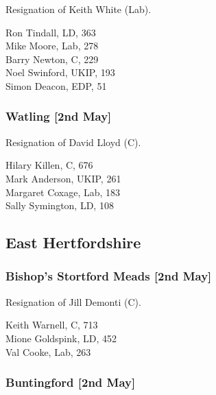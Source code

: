 \documentclass[a4paper,openany,10pt]{book}
\begin{document}
Resignation of Keith White (Lab).



Ron Tindall, LD, 363\\
Mike Moore, Lab, 278\\
Barry Newton, C, 229\\
Noel Swinford, UKIP, 193\\
Simon Deacon, EDP, 51\\


\subsubsection*{Watling \hspace*{\fill}\nolinebreak[1]%
\enspace\hspace*{\fill}
[2nd May]}


Resignation of David Lloyd (C).



Hilary Killen, C, 676\\
Mark Anderson, UKIP, 261\\
Margaret Coxage, Lab, 183\\
Sally Symington, LD, 108\\


\subsection*{East Hertfordshire}

\subsubsection*{Bishop's Stortford Meads \hspace*{\fill}\nolinebreak[1]%
\enspace\hspace*{\fill}
[2nd May]}


Resignation of Jill Demonti (C).



Keith Warnell, C, 713\\
Mione Goldspink, LD, 452\\
Val Cooke, Lab, 263\\


\subsubsection*{Buntingford \hspace*{\fill}\nolinebreak[1]%
\enspace\hspace*{\fill}
[2nd May]}
\end{document}

